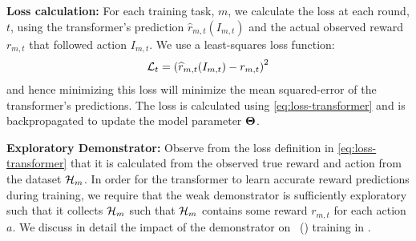 


\textbf{Loss calculation:} For each training task, $m$, we calculate the loss at each round, $t$, using the transformer's prediction $\hat{r}_{m,t}(I_{m,t})$ and the actual observed reward $r_{m,t}$ that followed action $I_{m,t}$. %
%
%
We use a least-squares loss function:
\begin{align}
    \mathcal{L}_t = \left(\widehat{r}_{m,t}(I_{m, t}) -  r_{m,t}\right)^2 \label{eq:loss-transformer}
\end{align}
and hence minimizing this loss will minimize the mean squared-error of the transformer's predictions.
The loss is calculated using \eqref{eq:loss-transformer} and is backpropagated to update the model parameter $\mathbf{\Theta}$.

\textbf{Exploratory Demonstrator:} Observe from the loss definition in \eqref{eq:loss-transformer} that it is calculated from the observed true reward and action from the dataset $\mathcal{H}_m$. 
% 
In order for the transformer to learn accurate reward predictions during training, we require that the weak demonstrator is sufficiently exploratory such that it collects $\mathcal{H}_m$ such that $\mathcal{H}_m$ contains some reward $r_{m,t}$ for each action $a$. We discuss in detail the impact of the demonstrator on \pred\ (\gt) training in . 

\vspace*{-0.5em}
